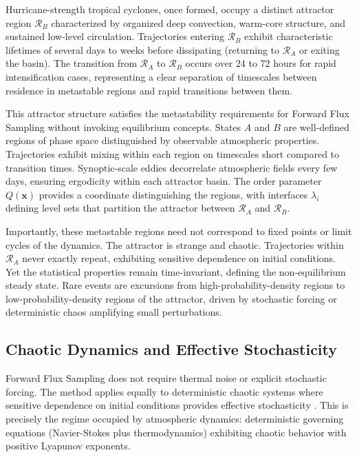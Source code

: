 \documentclass[11pt]{article}
\begin{document}
Hurricane-strength tropical cyclones, once formed, occupy a distinct attractor region $\mathcal{R}_B$ characterized by organized deep convection, warm-core structure, and sustained low-level circulation. Trajectories entering $\mathcal{R}_B$ exhibit characteristic lifetimes of several days to weeks before dissipating (returning to $\mathcal{R}_A$ or exiting the basin). The transition from $\mathcal{R}_A$ to $\mathcal{R}_B$ occurs over 24 to 72 hours for rapid intensification cases, representing a clear separation of timescales between residence in metastable regions and rapid transitions between them.

This attractor structure satisfies the metastability requirements for Forward Flux Sampling without invoking equilibrium concepts. States $A$ and $B$ are well-defined regions of phase space distinguished by observable atmospheric properties. Trajectories exhibit mixing within each region on timescales short compared to transition times. Synoptic-scale eddies decorrelate atmospheric fields every few days, ensuring ergodicity within each attractor basin. The order parameter $Q(\mathbf{x})$ provides a coordinate distinguishing the regions, with interfaces $\lambda_i$ defining level sets that partition the attractor between $\mathcal{R}_A$ and $\mathcal{R}_B$.

Importantly, these metastable regions need not correspond to fixed points or limit cycles of the dynamics. The attractor is strange and chaotic. Trajectories within $\mathcal{R}_A$ never exactly repeat, exhibiting sensitive dependence on initial conditions. Yet the statistical properties remain time-invariant, defining the non-equilibrium steady state. Rare events are excursions from high-probability-density regions to low-probability-density regions of the attractor, driven by stochastic forcing or deterministic chaos amplifying small perturbations.

\subsection{Chaotic Dynamics and Effective Stochasticity}

Forward Flux Sampling does not require thermal noise or explicit stochastic forcing. The method applies equally to deterministic chaotic systems where sensitive dependence on initial conditions provides effective stochasticity \citep{allen2009forward}. This is precisely the regime occupied by atmospheric dynamics: deterministic governing equations (Navier-Stokes plus thermodynamics) exhibiting chaotic behavior with positive Lyapunov exponents.
\end{document}

